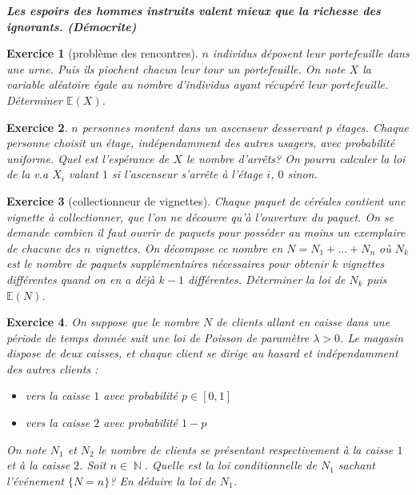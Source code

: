 \documentclass[12pt,a4paper,landscape]{article}
\DeclareMathOperator{\N}{\mathbb{N}}
\newtheorem{Exo}{Exercice}
\begin{document}
\emph{\textbf{
Les espoirs des hommes instruits valent mieux que la richesse des ignorants.
(Démocrite)
}}




\begin{Exo}[problème des rencontres]
	$n$ individus déposent leur portefeuille dans une urne. Puis ils piochent chacun leur tour un portefeuille. On note $X$ la variable aléatoire égale au nombre d'individus ayant récupéré leur portefeuille. Déterminer $\mathbb{E}(X)$. 
\end{Exo}

\begin{Exo}
	$n$ personnes montent dans un ascenseur desservant $p$ étages. Chaque personne choisit un étage, indépendamment des autres usagers, avec probabilité uniforme. Quel est l'espérance de $X$ le nombre d'arrêts? On pourra calculer la loi de la v.a $X_i$ valant $1$ si l'ascenseur s'arrête à l'étage $i$, $0$ sinon.
\end{Exo}

\begin{Exo}[collectionneur de vignettes]
Chaque paquet de céréales contient une vignette à collectionner, que l'on ne découvre qu'à l'ouverture du paquet. On se demande combien il faut ouvrir de
paquets pour posséder au moins un exemplaire de chacune des $n$ vignettes.
On décompose ce nombre en $N=N_1+...+N_n$ où $N_k$ est le nombre de paquets supplémentaires nécessaires pour obtenir $k$ vignettes différentes quand on en a déjà $k-1$ différentes. Déterminer la loi de $N_k$ puis $\mathbb{E}(N)$.
\end{Exo} 

\begin{Exo}
	On suppose que le nombre $N$ de clients allant en caisse dans une période de temps donnée suit une loi de Poisson de paramètre $\lambda>0$. Le magasin dispose de deux caisses, et chaque client se dirige au hasard et indépendamment des autres clients :
\begin{itemize}
	\item vers la caisse $1$ avec probabilité $p\in[0,1]$
	\item vers la caisse $2$ avec probabilité $1-p$
\end{itemize}

On note $N_1$ et $N_2$ le nombre de clients se présentant respectivement à la caisse $1$ et à la caisse $2$. Soit $n\in\N$. Quelle est la loi conditionnelle de $N_1$ sachant l’événement $\{N=n\}$? En déduire la loi de $N_1$.
\end{Exo}
\end{document}
